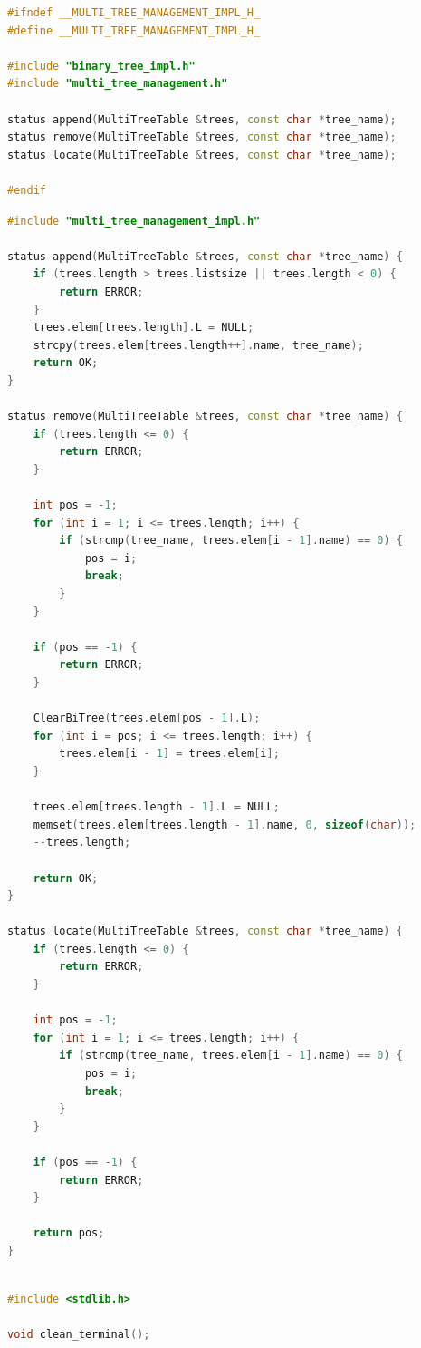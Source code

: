 \documentclass[supercite]{Experimental_Report}
\theoremstyle{definition}
\begin{document}
\begin{lstlisting}[caption={$multi\_tree\_management\_impl.h$}, language=C++, frame=single]
#ifndef __MULTI_TREE_MANAGEMENT_IMPL_H_
#define __MULTI_TREE_MANAGEMENT_IMPL_H_

#include "binary_tree_impl.h"
#include "multi_tree_management.h"

status append(MultiTreeTable &trees, const char *tree_name);
status remove(MultiTreeTable &trees, const char *tree_name);
status locate(MultiTreeTable &trees, const char *tree_name);

#endif
\end{lstlisting}

\begin{lstlisting}[caption={$multi\_tree\_management\_impl.cpp$}, language=C++, frame=single]
#include "multi_tree_management_impl.h"

status append(MultiTreeTable &trees, const char *tree_name) {
	if (trees.length > trees.listsize || trees.length < 0) {
		return ERROR;
	}
	trees.elem[trees.length].L = NULL;
	strcpy(trees.elem[trees.length++].name, tree_name);
	return OK;
}

status remove(MultiTreeTable &trees, const char *tree_name) {
	if (trees.length <= 0) {
		return ERROR;
	}

	int pos = -1;
	for (int i = 1; i <= trees.length; i++) {
		if (strcmp(tree_name, trees.elem[i - 1].name) == 0) {
			pos = i;
			break;
		}
	}

	if (pos == -1) {
		return ERROR;
	}

	ClearBiTree(trees.elem[pos - 1].L);
	for (int i = pos; i <= trees.length; i++) {
		trees.elem[i - 1] = trees.elem[i];
	}

	trees.elem[trees.length - 1].L = NULL;
	memset(trees.elem[trees.length - 1].name, 0, sizeof(char));
	--trees.length;

	return OK;
}

status locate(MultiTreeTable &trees, const char *tree_name) {
	if (trees.length <= 0) {
		return ERROR;
	}

	int pos = -1;
	for (int i = 1; i <= trees.length; i++) {
		if (strcmp(tree_name, trees.elem[i - 1].name) == 0) {
			pos = i;
			break;
		}
	}

	if (pos == -1) {
		return ERROR;
	}

	return pos;
}
	
\end{lstlisting}
	
\begin{lstlisting}[caption={$utils.h$}, language=C++, frame=single]
#include <stdlib.h>

void clean_terminal();
\end{lstlisting}
\end{document}
